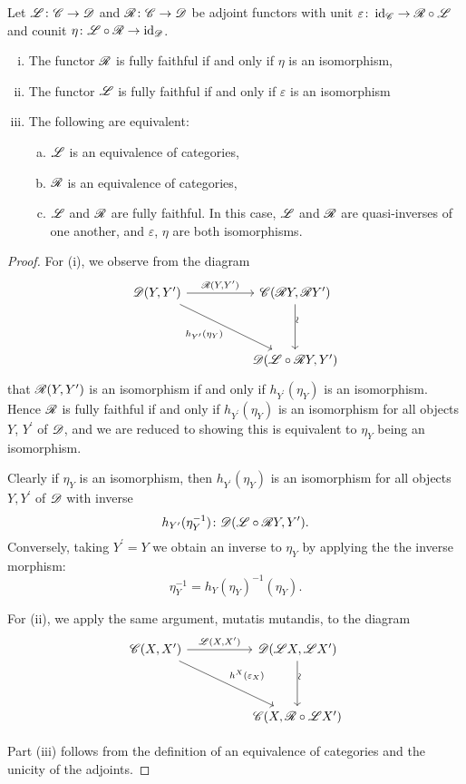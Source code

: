 \documentclass[10pt]{amsart}
\begin{document}
\begin{prop}\label{adjointequiv}
  Let $\mathscr{L} \colon \mathscr{C} \to \mathscr{D}$ and $\mathscr{R} \colon \mathscr{C} \to \mathscr{D}$ be adjoint functors with unit $\varepsilon \colon \operatorname{id}_{\mathscr{C}} \to \mathscr{R} \circ \mathscr{L}$ and counit $\eta \colon \mathscr{L} \circ \mathscr{R} \to \operatorname{id}_{\mathscr{D}}$.
  \begin{enumerate}[(i)]
  \item
    The functor $\mathscr{R}$ is fully faithful if and only if $\eta$ is an isomorphism,
  \item
    The functor $\mathscr{L}$ is fully faithful if and only if $\varepsilon$ is an isomorphism
  \item
    The following are equivalent:
    \begin{enumerate}[(a)]
    \item
      $\mathscr{L}$ is an equivalence of categories,
    \item
      $\mathscr{R}$ is an equivalence of categories,
    \item
      $\mathscr{L}$ and $\mathscr{R}$ are fully faithful.
      In this case, $\mathscr{L}$ and $\mathscr{R}$ are quasi-inverses of one another, and $\varepsilon$, $\eta$ are both isomorphisms.
    \end{enumerate}
  \end{enumerate}
  
  \begin{proof}
    For (i), we observe from the diagram
    $$\begin{tikzcd}
      \D(Y, Y^\prime) \arrow[swap]{rrdd}{h_{Y^\prime}(\eta_Y)}\arrow{rr}{\RA(Y,Y^\prime)} && \C(\RA Y, \RA Y^\prime)\arrow{dd}[rotate=90,yshift=-0.5 ex]{\sim}\\
      \\
      && \D(\LA \circ \RA Y, Y^\prime)
    \end{tikzcd}$$
    that $\mathscr{R}(Y,Y^\prime)$ is an isomorphism if and only if $h_{Y^\prime}(\eta_Y)$ is an isomorphism.
    Hence $\mathscr{R}$ is fully faithful if and only if $h_{Y^\prime}(\eta_Y)$ is an isomorphism for all objects $Y$, $Y^\prime$ of $\mathscr{D}$, and we are reduced to showing this is equivalent to $\eta_Y$ being an isomorphism.
    
    Clearly if $\eta_Y$ is an isomorphism, then $h_{Y^\prime}(\eta_Y)$ is an isomorphism for all objects $Y, Y^\prime$ of $\mathscr{D}$ with inverse
    $$h_{Y^\prime}(\eta_Y^{-1}) \colon \mathscr{D}(\mathscr{L} \circ \mathscr{R} Y, Y^\prime).$$
    Conversely, taking $Y^\prime = Y$ we obtain an inverse to $\eta_Y$ by applying the the inverse morphism:
    $$\eta_Y^{-1} = h_{Y}(\eta_Y)^{-1}(\eta_Y).$$
    
    For (ii), we apply the same argument, mutatis mutandis, to the diagram
    $$\begin{tikzcd}
      \C(X,X^\prime) \arrow{rrdd}{h^X(\varepsilon_X)}\arrow{rr}{\LA(X,X^\prime)} && \D(\LA X, \LA X^\prime)\arrow{dd}[rotate=90,yshift=-.5ex]{\sim}\\
      \\
      && \C(X, \RA \circ \LA X^\prime)
    \end{tikzcd}$$
    
    Part (iii) follows from the definition of an equivalence of categories and the unicity of the adjoints.
  \end{proof}
\end{prop}
\end{document}
